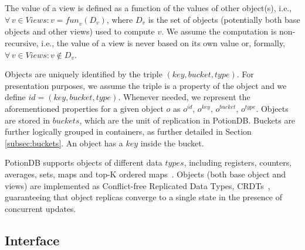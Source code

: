 \documentclass[sigconf, nonacm]{acmart}
\begin{document}
The value of a view is defined as a function of the values of other object(s), i.e., 
$\forall\, v \in \mathit{Views} : v = \mathit{fun}_v(D_v)$, 
where $D_v$ is the set of objects (potentially both base objects and other views) used to compute $v$.
We assume the computation is non-recursive, i.e., the value of a view is never based on its own value or, formally, 
$\forall\, v \in \mathit{Views} : v \notin D_v$.

Objects are uniquely identified by the triple $\mathit{(key, bucket, type)}$.
For presentation purposes, we assume the triple is a property of the object and we define $\mathit{id} = \mathit{(key, bucket, type)}$.
Whenever needed, we represent the aforementioned properties for a given object $o$ as
$o^{\mathit{id}}$, $o^{\mathit{key}}$, $o^{\mathit{bucket}}$, $o^{\mathit{type}}$.
Objects are stored in $\mathit{buckets}$, which are the unit of replication in PotionDB. 
Buckets are further logically grouped in containers, as further
detailed in Section \ref{subsec:buckets}. An object has a $\mathit{key}$ inside the bucket.

PotionDB supports objects of different data $\mathit{types}$, including registers, counters, averages, sets, maps
and top-K ordered maps~\cite{Cabrita17Nonuniform}.
Objects (both base object and views) are implemented as Conflict-free Replicated 
Data Types, CRDTs~\cite{crdt}, guaranteeing that object replicas converge to a single state
in the presence of concurrent updates.

\subsection{Interface}
\label{subsec:interface}
\end{document}
